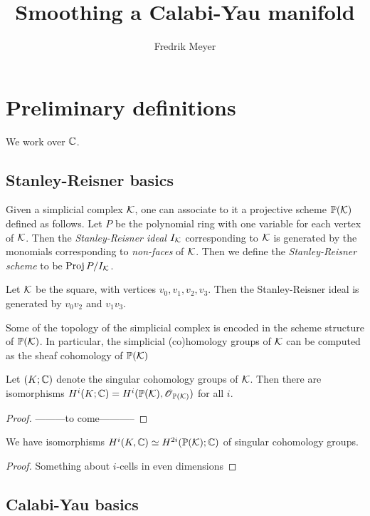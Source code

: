 \documentclass[]{uiophd}
\begin{document}
\title{Smoothing a Calabi-Yau manifold}
\author{Fredrik Meyer}
\maketitle 

\chapter{Preliminary definitions}

We work over $\mathbb{C}$. 

\section{Stanley-Reisner basics}

Given a simplicial complex $\mathcal K$, one can associate to it a projective scheme $\mathbb{P}(\mathcal K)$ defined as follows. Let $P$ be the polynomial ring with one variable for each vertex of $\mathcal K$. Then the \emph{Stanley-Reisner ideal $I_\mathcal K$} corresponding to $\mathcal K$ is generated by the monomials corresponding to \emph{non-faces} of $\mathcal K$. Then we define the \emph{Stanley-Reisner scheme} to be $\operatorname{Proj} P/I_\mathcal K$. 

\begin{example}
Let $\mathcal K$ be the square, with vertices $v_0,v_1,v_2,v_3$. Then the Stanley-Reisner ideal is generated by $v_0v_2$ and $v_1v_3$.
\end{example}

Some of the topology of the simplicial complex is encoded in the scheme structure of $\mathbb{P}(\mathcal K)$. In particular, the simplicial (co)homology groups of $\mathcal K$ can be computed as the sheaf cohomology of $\mathbb{P}(\mathcal K)$

\begin{lemma}
Let $(K;\mathbb{C})$ denote the singular cohomology groups of $\mathcal K$. Then there are isomorphisms $H^i(K;\mathbb{C})=H^i(\mathbb{P}(\mathcal K),\operatorname{\mathscr{O}}_{\mathbb{P}(\mathcal K)})$ for all $i$.
\end{lemma}
\begin{proof}
---------to come-----------
\end{proof}

\begin{corr}
We have isomorphisms $H^i(K,\mathbb{C}) \simeq H^{2i}(\mathbb{P}(\mathcal K);\mathbb{C})$ of singular cohomology groups.
\end{corr}
\begin{proof}
Something about $i$-cells in even dimensions
\end{proof}

\section{Calabi-Yau basics}
\end{document}
